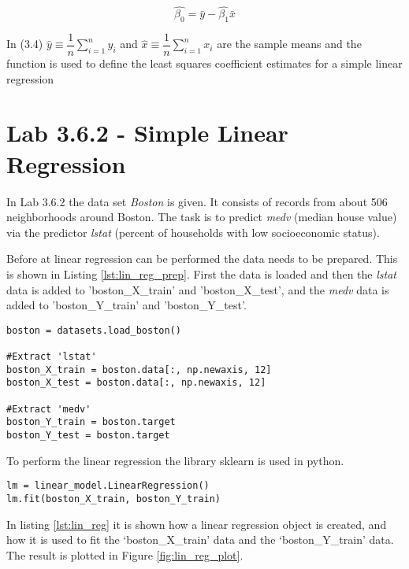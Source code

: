 \begin{equation}
\hat{\beta_0} = \bar{y} -\hat{\beta_1}\bar{x}
\end{equation}

In (3.4) $\hat{y} \equiv \dfrac{1}{n}\sum\limits_{i=1}^ny_i$ and 
$\hat{x}\equiv \dfrac{1}{n}\sum\limits_{i=1}^nx_i$ are the sample means and the function is used to define the least squares coefficient estimates for a simple linear regression 


\section{Lab 3.6.2 - Simple Linear Regression}

In Lab 3.6.2 the data set \emph{Boston} is given. It consists of records from about 506 neighborhoods around Boston. The task is to predict \emph{medv} (median house value) via the predictor \emph{lstat} (percent of households with low socioeconomic status).

Before at linear regression can be performed the data needs to be prepared. This is shown in Listing \ref{lst:lin_reg_prep}. First the data is loaded and then the \emph{lstat} data is added to 'boston\_X\_train' and 'boston\_X\_test', and the \emph{medv} data is added to 'boston\_Y\_train' and 'boston\_Y\_test'.

\begin{lstlisting}[caption={Data preparation for linear regression}, label=lst:lin_reg_prep, mathescape=true]
boston = datasets.load_boston()

#Extract 'lstat'
boston_X_train = boston.data[:, np.newaxis, 12]
boston_X_test = boston.data[:, np.newaxis, 12]

#Extract 'medv'
boston_Y_train = boston.target
boston_Y_test = boston.target
\end{lstlisting}

To perform the linear regression the library sklearn is used in python. 

\begin{lstlisting}[caption={Python Linear Regression function}, label=lst:lin_reg, mathescape=true]
lm = linear_model.LinearRegression()
lm.fit(boston_X_train, boston_Y_train)
\end{lstlisting}

In listing \ref{lst:lin_reg} it is shown how a linear regression object is created, and how it is used to fit the ‘boston\_X\_train’ data and the ‘boston\_Y\_train’ data.
The result is plotted in Figure \ref{fig:lin_reg_plot}.

